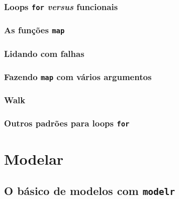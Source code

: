 \documentclass[
]{latex/krantz}
\theoremstyle{definition}
\theoremstyle{definition}
\theoremstyle{definition}
\theoremstyle{definition}
\theoremstyle{remark}
\begin{document}
\hypertarget{loops-for-versus-funcionais}{%
\section{\texorpdfstring{Loops \texttt{for} \emph{versus} funcionais}{Loops for versus funcionais}}\label{loops-for-versus-funcionais}}

\hypertarget{as-funuxe7uxf5es-map}{%
\section{\texorpdfstring{As funções \texttt{map}}{As funções map}}\label{as-funuxe7uxf5es-map}}

\hypertarget{lidando-com-falhas}{%
\section{Lidando com falhas}\label{lidando-com-falhas}}

\hypertarget{fazendo-map-com-vuxe1rios-argumentos}{%
\section{\texorpdfstring{Fazendo \texttt{map} com vários argumentos}{Fazendo map com vários argumentos}}\label{fazendo-map-com-vuxe1rios-argumentos}}

\hypertarget{walk}{%
\section{Walk}\label{walk}}

\hypertarget{outros-padruxf5es-para-loops-for}{%
\section{\texorpdfstring{Outros padrões para loops \texttt{for}}{Outros padrões para loops for}}\label{outros-padruxf5es-para-loops-for}}

\hypertarget{part-modelar}{%
\part{Modelar}\label{part-modelar}}

\hypertarget{o-buxe1sico-de-modelos-com-modelr}{%
\chapter{\texorpdfstring{O básico de modelos com \texttt{modelr}}{O básico de modelos com modelr}}\label{o-buxe1sico-de-modelos-com-modelr}}
\end{document}
